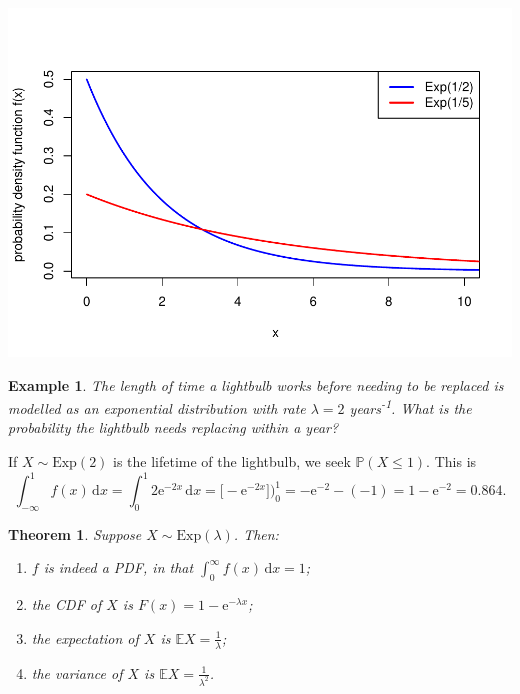 \documentclass[
  a4paper,
]{book}
\providecommand{\tightlist}{%
  \setlength{\itemsep}{0pt}\setlength{\parskip}{0pt}}
\newtheorem{theorem}{Theorem}[chapter]
\theoremstyle{definition}
\theoremstyle{definition}
\newtheorem{example}{Example}[chapter]
\theoremstyle{definition}
\theoremstyle{definition}
\theoremstyle{remark}
\begin{document}
\includegraphics{math1710_files/figure-latex/exp-pic-1.pdf}

\begin{example}
\emph{The length of time a lightbulb works before needing to be replaced is modelled as an exponential distribution with rate \(\lambda = 2\) years\textsuperscript{-1}. What is the probability the lightbulb needs replacing within a year?}

If \(X \sim \text{Exp}(2)\) is the lifetime of the lightbulb, we seek \(\mathbb P(X \leq 1)\). This is
\[ \int_{-\infty}^1 f(x)\, \mathrm{d}x = \int_0^1 2 \mathrm e^{-2x} \, \mathrm dx = \big[ -\mathrm e^{-2x} \big])_0^1 = -\mathrm e^{-2} -(-1) = 1 - \mathrm e^{-2} = 0.864.  \]
\end{example}

\begin{theorem}

Suppose \(X \sim \text{Exp}(\lambda)\). Then:

\begin{enumerate}
\def\labelenumi{\arabic{enumi}.}
\tightlist
\item
  \(f\) is indeed a PDF, in that \(\displaystyle\int_0^\infty f(x)\,\mathrm{d}x = 1\);
\item
  the CDF of \(X\) is \(F(x) = 1 - \mathrm{e}^{-\lambda x}\);
\item
  the expectation of \(X\) is \(\mathbb EX = \displaystyle\frac{1}{\lambda}\);
\item
  the variance of \(X\) is \(\mathbb EX = \displaystyle\frac{1}{\lambda^2}\).
\end{enumerate}

\end{theorem}
\end{document}
